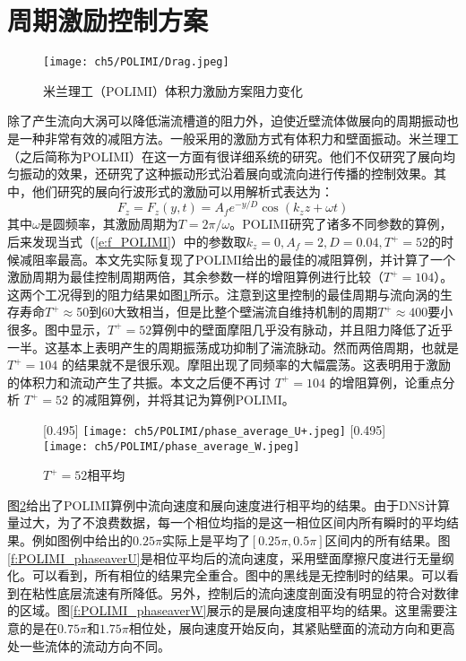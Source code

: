 \section{周期激励控制方案}
\begin{figure}[htb]
  \centering
  \texttt{[image: ch5/POLIMI/Drag.jpeg]}
  \caption{米兰理工（POLIMI）体积力激励方案阻力变化}\label{f:POLIMI_DARG}
\end{figure}
除了产生流向大涡可以降低湍流槽道的阻力外，迫使近壁流体做展向的周期振动也是一种非常有效的减阻方法。一般采用的激励方式有体积力和壁面振动。米兰理工（之后简称为POLIMI）在这一方面有很详细系统的研究\cite{Gatti2016,Gatti2013,Quadrio2009}。他们不仅研究了展向均匀振动的效果，还研究了这种振动形式沿着展向或流向进行传播的控制效果。其中，他们研究的展向行波形式的激励可以用解析式表达为：
\begin{equation}\label{e:f_POLIMI}
  F_z  = F_z \left( {y,t} \right) = A_f e^{ - y/D} \cos \left( k_zz + \omega t \right)
\end{equation}
其中$\omega$是圆频率，其激励周期为$T=2\pi/\omega$。POLIMI研究了诸多不同参数的算例，后来发现当式（\ref{e:f_POLIMI}）中的参数取$k_z=0,A_f=2,D=0.04,T^+=52$的时候减阻率最高。本文先实际复现了POLIMI给出的最佳的减阻算例，并计算了一个激励周期为最佳控制周期两倍，其余参数一样的增阻算例进行比较（$T^+=104$）。这两个工况得到的阻力结果如图\ref{f:POLIMI_DARG}所示。注意到这里控制的最佳周期与流向涡的生存寿命$T^+\approx$50\cite{Jimenez1999}到60\cite{del2006}大致相当，但是比整个壁湍流自维持机制的周期$T^+\approx400$\cite{Jimenez2005}要小很多。图中显示，$T^+=52$算例中的壁面摩阻几乎没有脉动，并且阻力降低了近乎一半。这基本上表明产生的周期振荡成功抑制了湍流脉动。然而两倍周期，也就是 $T^+=104$ 的结果就不是很乐观。摩阻出现了同频率的大幅震荡。这表明用于激励的体积力和流动产生了共振。本文之后便不再讨 $T^+=104$ 的增阻算例，论重点分析 $T^+=52$ 的减阻算例，并将其记为算例POLIMI。

\begin{figure}[htb]
  \centering
  [0.495\textwidth]
    {\texttt{[image: ch5/POLIMI/phase\_average\_U+.jpeg]}}
  [0.495\textwidth]
    {\texttt{[image: ch5/POLIMI/phase\_average\_W.jpeg]}}
  \caption{$T^+=52$相平均}\label{f:POLIMI_phaseaver}
\end{figure}
图\ref{f:POLIMI_phaseaver}给出了POLIMI算例中流向速度和展向速度进行相平均的结果。由于DNS计算量过大，为了不浪费数据，每一个相位均指的是这一相位区间内所有瞬时的平均结果。例如图例中给出的$0.25\pi$实际上是平均了$[0.25\pi,0.5\pi]$区间内的所有结果。图\ref{f:POLIMI_phaseaverU}是相位平均后的流向速度，采用壁面摩擦尺度进行无量纲化。可以看到，所有相位的结果完全重合。图中的黑线是无控制时的结果。可以看到在粘性底层流速有所降低。另外，控制后的流向速度剖面没有明显的符合对数律的区域。图\ref{f:POLIMI_phaseaverW}展示的是展向速度相平均的结果。这里需要注意的是在$0.75\pi$和$1.75\pi$相位处，展向速度开始反向，其紧贴壁面的流动方向和更高处一些流体的流动方向不同。

